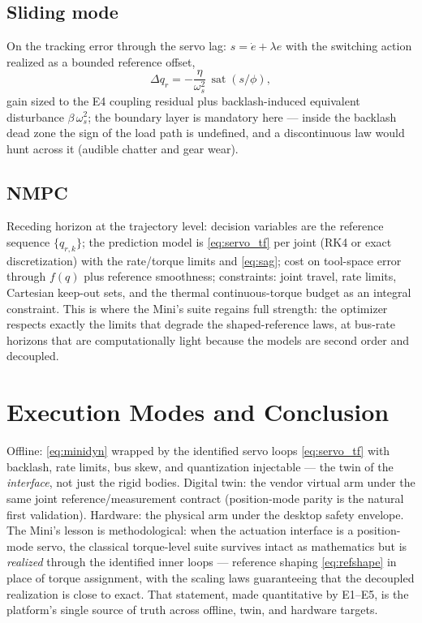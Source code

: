 \documentclass[conference]{IEEEtran}
\newcommand{\sat}{\operatorname{sat}}
\begin{document}
\subsection{Sliding mode}
On the tracking error through the servo lag: $s = \dot e + \lambda e$ with the switching action realized as a bounded reference offset,
\begin{equation}
\Delta q_r = -\frac{\eta}{\omega_s^2}\,\sat(s/\phi),
\end{equation}
gain sized to the E4 coupling residual plus backlash-induced equivalent disturbance $\beta\,\omega_s^2$; the boundary layer is mandatory here --- inside the backlash dead zone the sign of the load path is undefined, and a discontinuous law would hunt across it (audible chatter and gear wear).

\subsection{NMPC}
Receding horizon at the trajectory level: decision variables are the reference sequence $\{q_{r,k}\}$; the prediction model is \eqref{eq:servo_tf} per joint (RK4 or exact discretization) with the rate/torque limits and \eqref{eq:sag}; cost on tool-space error through $f(q)$ plus reference smoothness; constraints: joint travel, rate limits, Cartesian keep-out sets, and the thermal continuous-torque budget as an integral constraint. This is where the Mini's suite regains full strength: the optimizer respects exactly the limits that degrade the shaped-reference laws, at bus-rate horizons that are computationally light because the models are second order and decoupled.

\section{Execution Modes and Conclusion}
Offline: \eqref{eq:minidyn} wrapped by the identified servo loops \eqref{eq:servo_tf} with backlash, rate limits, bus skew, and quantization injectable --- the twin of the \emph{interface}, not just the rigid bodies. Digital twin: the vendor virtual arm under the same joint reference/measurement contract (position-mode parity is the natural first validation). Hardware: the physical arm under the desktop safety envelope. The Mini's lesson is methodological: when the actuation interface is a position-mode servo, the classical torque-level suite survives intact as mathematics but is \emph{realized} through the identified inner loops --- reference shaping \eqref{eq:refshape} in place of torque assignment, with the scaling laws guaranteeing that the decoupled realization is close to exact. That statement, made quantitative by E1--E5, is the platform's single source of truth across offline, twin, and hardware targets.
\end{document}
